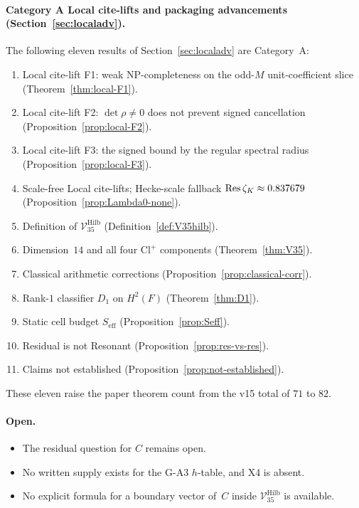 \paragraph{Category A Local cite-lifts and packaging advancements (Section~\ref{sec:localadv}).}
The following eleven results of Section~\ref{sec:localadv} are Category~A:
\begin{enumerate}
\item Local cite-lift F1: weak NP-completeness on the odd-$M$ unit-coefficient slice (Theorem~\ref{thm:local-F1}).
\item Local cite-lift F2: $\det\rho\neq0$ does not prevent signed cancellation (Proposition~\ref{prop:local-F2}).
\item Local cite-lift F3: the signed bound by the regular spectral radius (Proposition~\ref{prop:local-F3}).
\item Scale-free Local cite-lifts; Hecke-scale fallback $\operatorname*{Res}\zeta_K\approx0.837679$ (Proposition~\ref{prop:Lambda0-none}).
\item Definition of $\mathcal V_{35}^{\mathrm{Hilb}}$ (Definition~\ref{def:V35hilb}).
\item Dimension~$14$ and all four $\mathrm{Cl}^+$ components (Theorem~\ref{thm:V35}).
\item Classical arithmetic corrections (Proposition~\ref{prop:classical-corr}).
\item Rank-$1$ classifier $D_1$ on $H^2(F)$ (Theorem~\ref{thm:D1}).
\item Static cell budget $S_{\mathrm{eff}}$ (Proposition~\ref{prop:Seff}).
\item Residual is not Resonant (Proposition~\ref{prop:res-vs-res}).
\item Claims not established (Proposition~\ref{prop:not-established}).
\end{enumerate}
These eleven raise the paper theorem count from the v15 total of $71$ to $82$.

\paragraph{Open.}
\begin{itemize}
\item The residual question for $C$ remains open.
\item No written supply exists for the G-A3 $h$-table, and X4 is absent.
\item No explicit formula for a boundary vector of~$C$ inside $\mathcal V_{35}^{\mathrm{Hilb}}$ is available.
\end{itemize}
